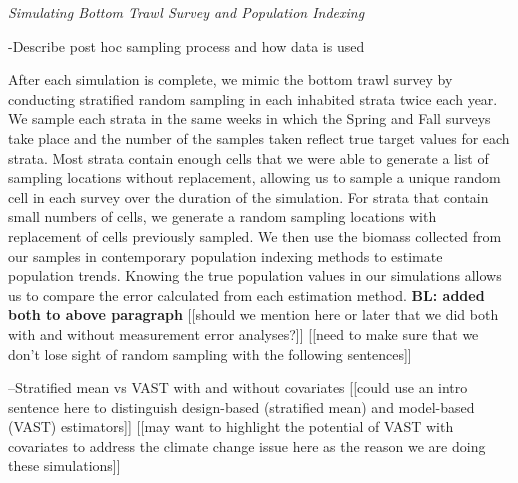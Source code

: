 \documentclass[
  12pt,
]{article}
\begin{document}
\emph{Simulating Bottom Trawl Survey and Population Indexing}

-Describe post hoc sampling process and how data is used

After each simulation is complete, we mimic the bottom trawl survey by conducting stratified random sampling in each inhabited strata twice each year. We sample each strata in the same weeks in which the Spring and Fall surveys take place and the number of the samples taken reflect true target values for each strata. Most strata contain enough cells that we were able to generate a list of sampling locations without replacement, allowing us to sample a unique random cell in each survey over the duration of the simulation. For strata that contain small numbers of cells, we generate a random sampling locations with replacement of cells previously sampled. We then use the biomass collected from our samples in contemporary population indexing methods to estimate population trends. Knowing the true population values in our simulations allows us to compare the error calculated from each estimation method.
\textbf{BL: added both to above paragraph}
{[}{[}should we mention here or later that we did both with and without measurement error analyses?{]}{]}
{[}{[}need to make sure that we don't lose sight of random sampling with the following sentences{]}{]}

--Stratified mean vs VAST with and without covariates
{[}{[}could use an intro sentence here to distinguish design-based (stratified mean) and model-based (VAST) estimators{]}{]}
{[}{[}may want to highlight the potential of VAST with covariates to address the climate change issue here as the reason we are doing these simulations{]}{]}
\end{document}
